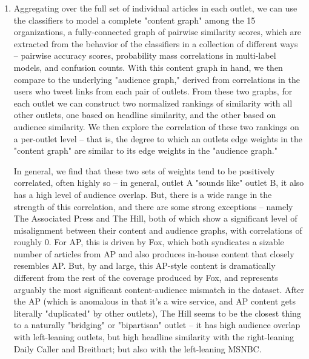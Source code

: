 \documentclass{scrartcl}
\begin{document}
\begin{enumerate}
\item Aggregating over the full set of individual articles in each outlet, we can use the classifiers to model a complete "content graph" among the 15 organizations, a fully-connected graph of pairwise similarity scores, which are extracted from the behavior of the classifiers in a collection of different ways -- pairwise accuracy scores, probability mass correlations in multi-label models, and confusion counts. With this content graph in hand, we then compare to the underlying "audience graph," derived from correlations in the users who tweet links from each pair of outlets. From these two graphs, for each outlet we can construct two normalized rankings of similarity with all other outlets, one based on headline similarity, and the other based on audience similarity. We then explore the correlation of these two rankings on a per-outlet level -- that is, the degree to which an outlets edge weights in the "content graph" are similar to its edge weights in the "audience graph."

In general, we find that these two sets of weights tend to be positively correlated, often highly so -- in general, outlet A "sounds like" outlet B, it also has a high level of audience overlap. But, there is a wide range in the strength of this correlation, and there are some strong exceptions -- namely The Associated Press and The Hill, both of which show a significant level of misalignment between their content and audience graphs, with correlations of roughly 0. For AP, this is driven by Fox, which both syndicates a sizable number of articles from AP and also produces in-house content that closely resembles AP. But, by and large, this AP-style content is dramatically different from the rest of the coverage produced by Fox, and represents arguably the most significant content-audience mismatch in the dataset. After the AP (which is anomalous in that it's a wire service, and AP content gets literally "duplicated" by other outlets), The Hill seems to be the closest thing to a naturally "bridging" or "bipartisan" outlet -- it has high audience overlap with left-leaning outlets, but high headline similarity with the right-leaning Daily Caller and Breitbart; but also with the left-leaning MSNBC.


\end{enumerate}
\end{document}
